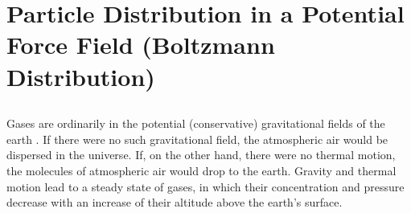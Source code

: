 \section[Boltzmann Distribution]{Particle Distribution in a Potential Force Field (Boltzmann Distribution)}
\label{sec-10.4}


\subsection{}\label{10.4.1} 
Gases are ordinarily in the potential (conservative) gravitational fields of the earth . If there were no such gravitational field, the atmospheric air would be dispersed in the universe. If, on the other hand, there were no thermal motion, the molecules of atmospheric air would drop to the earth. Gravity and thermal motion lead to a steady state of gases, in which their concentration and pressure decrease with an increase of their altitude above the earth's surface.

